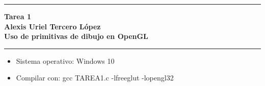 \documentclass[12pt, letterpaper]{article}
\author{Alexis Tercero: alexistercero55@gamil.com}
\begin{document}


\rule{\textwidth}{1pt}
\begin{center} %
    \bfseries Tarea 1 \\ Alexis Uriel Tercero López\\Uso de primitivas de dibujo en OpenGL
\end{center}
\rule{\textwidth}{1pt}

\begin{itemize}
    \item Sistema operativo: Windows 10
    \item Compilar con: gcc TAREA1.c -lfreeglut -lopengl32
\end{itemize}
\end{document}
